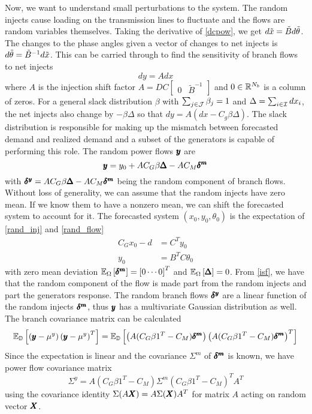 Now, we want to understand small perturbations to the system.
The random injects cause loading on the transmission lines to fluctuate and the flows are random variables themselves. Taking the derivative of \ref{dcpow}, we get $d \tilde{x} = \tilde{B} d \tilde{\theta} $.  The changes to the phase angles given a vector of changes to net injects is $ d \tilde{\theta} = \tilde{B}^{-1} d \tilde{x} $.  This can be carried through to find the sensitivity of branch flows to net injects 
\begin{equation}\label{isf}
 d y = A d x 
\end{equation}
where $A$ is the injection shift factor $A = D C \left[\begin{array}{cc} 0 & \tilde{B}^{-1} \end{array} \right]$ and $0\in \mathbb{R}^{N_b}$ is a column of zeros.  For a general slack distribution $\beta$ with $\sum_{j \in \mathcal{J}} \beta_j=1$ and $\Delta = \sum_{i \in \mathcal{I}} dx_i$, the net injects also change by $- \beta \Delta$ so that $dy = A\left( dx - C_g \beta \Delta \right)$.  The slack distribution is responsible for making up the mismatch between forecasted demand and realized demand and a subset of the generators is capable of performing this role.  The random power flows $\pmb{y}$ are
\begin{equation}\label{rand_flow}
 \pmb{y} = y_0+ A C_G \beta \pmb{\Delta}  - A C_M \pmb{\delta^m} 
\end{equation}
with $\pmb{\delta^y} = A C_G \beta \pmb{\Delta} - AC_M \pmb{\delta^m}$ being the random component of branch flows.
Without loss of generality, we can assume that the random injects have zero mean.  If we know them to have a nonzero mean, we can shift the forecasted system to account for it. 
The forecasted system  $\left(x_0, y_0, \theta_0\right)$ is the expectation of \ref{rand_inj} and \ref{rand_flow}
\begin{align*}
C_G x_0 - d &= C^T y_0 \\
y_0 &= B^T C \theta_0 
\end{align*}
with zero mean deviation $\mathbb{E}_{\Omega} \left[ \pmb{\delta^m} \right]=\left[0 \cdots 0\right]^T$ and $\mathbb{E}_{\Omega} \left[ \pmb{\Delta} \right]=0$. 
From \ref{isf}, we have that the random component of the flow is made part from the random injects and part the generators response.   The random branch flows $\pmb{\delta^y}$ are a linear function of the random injects $\pmb{\delta^m}$, thus $\pmb{y}$ has a multivariate Gaussian distribution as well.  The branch covariance matrix can be calculated
\begin{equation*}
\mathbb{E}_{\mathbb{D}} \left[  \left( \pmb{y} - \mu^y \right) \left( \pmb{y} - \mu^y \right)^T  \right] = \mathbb{E}_{\mathbb{D}} \left[ \left( A(C_G\beta 1^T - C_M) \pmb{\delta^m} \right) \left( A(C_G\beta 1^T - C_M )\pmb{\delta^m} \right)^T  \right] 
\end{equation*}
Since the expectation is linear and the covariance $\Sigma^m$ of $\pmb{\delta^m}$ is known, we 
have power flow covariance matrix
\begin{equation}\label{branch_cov}
\Sigma^y = A(C_G\beta 1^T - C_M) \Sigma^m (C_G\beta 1^T - C_M)^T A^T
\end{equation}
using the covariance identity $\Sigma (A \pmb{X} ) = A \Sigma (\pmb{X}) A^T$ for matrix $A$ acting on random vector $\pmb{X}$.

